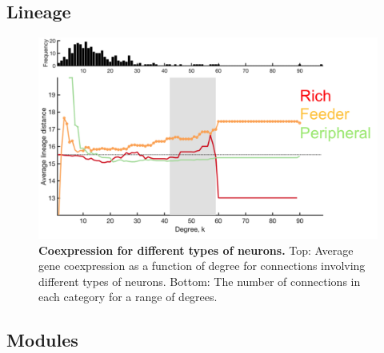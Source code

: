 \documentclass[10pt,letterpaper]{article}
\newlength\savedwidth
\newcommand\thickhline{\noalign{\global\savedwidth\arrayrulewidth\global\arrayrulewidth 2pt}%
\hline
\noalign{\global\arrayrulewidth\savedwidth}}
\begin{document}
\subsection*{Lineage}
\begin{figure}[!h]
\centering
    \includegraphics[width=1\textwidth]{LineageRFP}
 \caption{{\bf Coexpression for different types of neurons. }
Top: Average gene coexpression as a function of degree for connections involving different types of neurons. Bottom: The number of connections in each category for a range of degrees. }
 \label{Lineage}
 \end{figure}
\subsection*{Modules}





\end{document}
